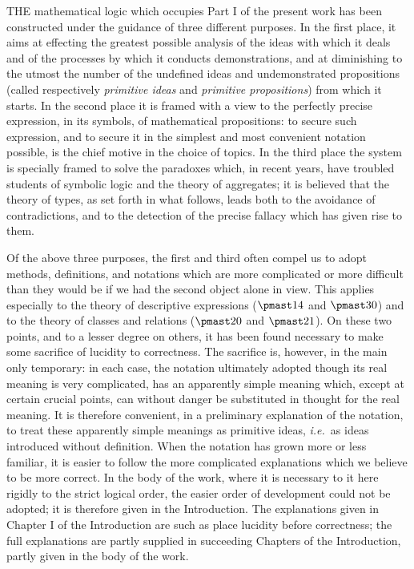 \documentclass[letterpaper,12pt,openany,leqno]{book}
\newcommand{\pagefirst}[1]{\marginnote[\boxed{\text{#1}}]{\boxed{\text{#1}}}}
\begin{document}
THE mathematical logic which occupies Part I of the present work has been constructed under the guidance of three different purposes. In the first place, it aims at effecting the greatest possible analysis of the ideas with which it deals and of the processes by which it conducts demonstrations, and at diminishing to the utmost the number of the undefined ideas and undemonstrated propositions (called respectively \textit{primitive ideas} and \textit{primitive propositions}) from which it starts. In the second place it is framed with a view to the perfectly precise expression, in its symbols, of mathematical propositions: to secure such expression, and to secure it in the simplest and most convenient notation possible, is the chief motive in the choice of topics. In the third place the system is specially framed to solve the paradoxes which, in recent years, have troubled students of symbolic logic and the theory of aggregates; it is believed that the theory of types, as set forth in what follows, leads both to the avoidance of contradictions, and to the detection of the precise fallacy which has given rise to them. 

Of the above three purposes, the first and third often compel us to adopt methods, definitions, and notations which are more complicated or more difficult than they would be if we had the second object alone in view. This applies especially to the theory of descriptive expressions ($\pmast14$ and $\pmast30$) and to the theory of classes and relations ($\pmast20$ and  $\pmast21$). On these two points, and to a lesser degree on others, it has been found necessary to make some sacrifice of lucidity to correctness. The sacrifice is, however, in the main only temporary: in each case, the notation ultimately adopted though its real meaning is very complicated, has an apparently simple meaning which, except at certain crucial points, can without danger be substituted in thought for the real meaning. It is therefore convenient, in a preliminary explanation of the notation, to treat these apparently simple meanings as primitive ideas, \textit{i.e.}\ as ideas introduced without definition. When the notation has grown more or less familiar, it is easier to follow the more complicated explanations which we believe to be more correct. In the body of the work, where it is necessary to it here rigidly to the strict logical order, \pagefirst{2} the easier order of development could not be adopted; it is therefore given in the Introduction. The explanations given in Chapter I of the Introduction are such as place lucidity before correctness; the full explanations are partly supplied in succeeding Chapters of the Introduction, partly given in the body of the work. 
\end{document}
